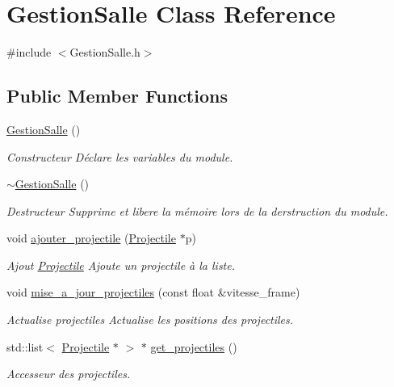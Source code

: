 \hypertarget{classGestionSalle}{}\section{Gestion\+Salle Class Reference}
\label{classGestionSalle}


{\ttfamily \#include $<$Gestion\+Salle.\+h$>$}

\subsection*{Public Member Functions}
\begin{DoxyCompactItemize}
\item 
\hyperlink{classGestionSalle_a1e182efaf1a90419768dbdcce5b3362f}{Gestion\+Salle} ()
\begin{DoxyCompactList}\small\item\em Constructeur Déclare les variables du module. \end{DoxyCompactList}\item 
\hyperlink{classGestionSalle_a94a5c95bc0b567b446c56eadfc4725e1}{$\sim$\+Gestion\+Salle} ()
\begin{DoxyCompactList}\small\item\em Destructeur Supprime et libere la mémoire lors de la derstruction du module. \end{DoxyCompactList}\item 
void \hyperlink{classGestionSalle_afa4dfd73b84ebbcc6fd0e8ada8d19749}{ajouter\+\_\+projectile} (\hyperlink{classProjectile}{Projectile} $\ast$p)
\begin{DoxyCompactList}\small\item\em Ajout \hyperlink{classProjectile}{Projectile} Ajoute un projectile à la liste. \end{DoxyCompactList}\item 
void \hyperlink{classGestionSalle_aa95413560b18a41625f4532093e079ab}{mise\+\_\+a\+\_\+jour\+\_\+projectiles} (const float \&vitesse\+\_\+frame)
\begin{DoxyCompactList}\small\item\em Actualise projectiles Actualise les positions des projectiles. \end{DoxyCompactList}\item 
std\+::list$<$ \hyperlink{classProjectile}{Projectile} $\ast$ $>$ $\ast$ \hyperlink{classGestionSalle_a0ba600eb02a796327b9cb3f17a534e7e}{get\+\_\+projectiles} ()
\begin{DoxyCompactList}\small\item\em Accesseur des projectiles. \end{DoxyCompactList}\item 

\end{DoxyCompactItemize}
